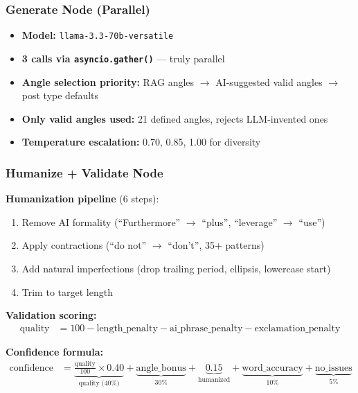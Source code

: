 \documentclass[12pt,a4paper]{article}
\begin{document}
\subsubsection{Generate Node (Parallel)}
\begin{itemize}[leftmargin=1.5em]
    \item \textbf{Model:} \texttt{llama-3.3-70b-versatile}
    \item \textbf{3 calls via \texttt{asyncio.gather()}} --- truly parallel
    \item \textbf{Angle selection priority:} RAG angles $\rightarrow$ AI-suggested valid angles $\rightarrow$ post type defaults
    \item \textbf{Only valid angles used:} 21 defined angles, rejects LLM-invented ones
    \item \textbf{Temperature escalation:} 0.70, 0.85, 1.00 for diversity
\end{itemize}

\subsubsection{Humanize + Validate Node}
\textbf{Humanization pipeline} (6 steps):
\begin{enumerate}[leftmargin=1.5em]
    \item Remove AI formality (``Furthermore'' $\rightarrow$ ``plus'', ``leverage'' $\rightarrow$ ``use'')
    \item Apply contractions (``do not'' $\rightarrow$ ``don't'', 35+ patterns)
    \item Add natural imperfections (drop trailing period, ellipsis, lowercase start)
    \item Trim to target length
\end{enumerate}

\textbf{Validation scoring:}
\begin{align*}
    \text{quality} &= 100 - \text{length\_penalty} - \text{ai\_phrase\_penalty} - \text{exclamation\_penalty}
\end{align*}

\textbf{Confidence formula:}
\begin{align*}
    \text{confidence} &= \underbrace{\frac{\text{quality}}{100} \times 0.40}_{\text{quality (40\%)}} + \underbrace{\text{angle\_bonus}}_{\text{30\%}} + \underbrace{0.15}_{\text{humanized}} + \underbrace{\text{word\_accuracy}}_{\text{10\%}} + \underbrace{\text{no\_issues}}_{\text{5\%}}
\end{align*}
\end{document}
